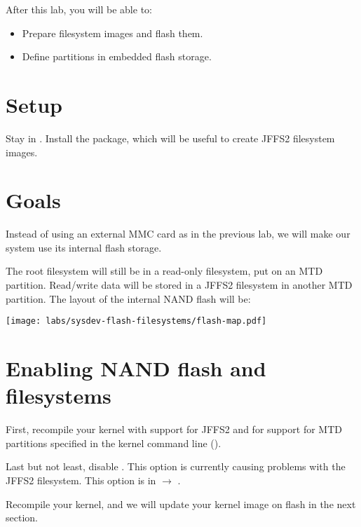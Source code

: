 
After this lab, you will be able to:
\begin{itemize}
\item Prepare filesystem images and flash them.
\item Define partitions in embedded flash storage.
\end{itemize}

\section{Setup}

Stay in . Install the
 package, which will be useful to create JFFS2
filesystem images.

\section{Goals}

Instead of using an external MMC card as in the previous lab, we will
make our system use its internal flash storage.

The root filesystem will still be in a read-only filesystem, put on an
MTD partition.  Read/write data will be stored in a JFFS2 filesystem
in another MTD partition. The layout of the internal NAND flash will
be:

\begin{center}
  \texttt{[image: labs/sysdev-flash-filesystems/flash-map.pdf]}
\end{center}

\section{Enabling NAND flash and filesystems}

First, recompile your kernel with support for JFFS2 and for support
for MTD partitions specified in the kernel command line
().

Last but not least, disable . This option
is currently causing problems with the JFFS2 filesystem. This option
is in  $\rightarrow$ .

Recompile your kernel, and we will update your kernel image on flash
in the next section.

